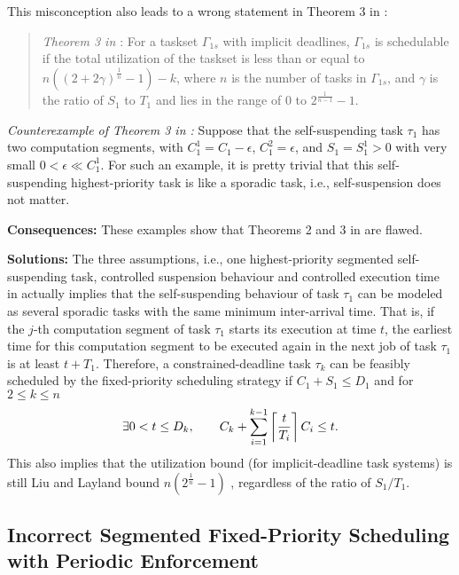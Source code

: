 This misconception also leads to a wrong statement in Theorem 3 in \cite{RTSS-KimANR13}:
\begin{quote}
{\it Theorem 3 in \cite{RTSS-KimANR13}}: For a taskset $\Gamma_{1s}$ with implicit deadlines, $\Gamma_{1s}$ is schedulable if the total utilization of the taskset is less than or equal to $n((2+2\gamma)^{\frac{1}{n}}-1)-k$, where $n$ is the number of tasks in $\Gamma_{1s}$, and $\gamma$ is the ratio of
$S_1$ to $T_1$ and lies in the range of $0$ to $2^{\frac{1}{n-1}}-1$. 
\end{quote}


{\it Counterexample of Theorem 3 in \cite{RTSS-KimANR13}:} Suppose that the self-suspending task $\tau_1$ has two computation segments, with $C_1^1 = C_1-\epsilon$, $C_1^2 = \epsilon$, and $S_1=S_1^1 > 0$ with very small $0 < \epsilon \ll C_1^1$. For such an example, it is pretty trivial that this self-suspending highest-priority task is like a sporadic task, i.e., self-suspension does not matter. 

{\bf Consequences:} These examples show that Theorems 2 and 3 in \cite{RTSS-KimANR13} are flawed.  

{\bf Solutions:} The three assumptions, i.e., one highest-priority segmented self-suspending task, controlled suspension behaviour and controlled execution time  in \cite{RTSS-KimANR13} actually implies that the self-suspending behaviour of task $\tau_1$ can be modeled as several sporadic tasks with the same minimum inter-arrival time. That is, if the $j$-th computation segment of task $\tau_1$ starts its execution at time $t$, the earliest time for this computation segment to be executed again in the next job of task $\tau_1$ is at least $t+T_1$. Therefore, a constrained-deadline task $\tau_k$ can be feasibly scheduled by the fixed-priority scheduling strategy if $C_1+S_1 \leq D_1$ and for $2 \leq k \leq n$
  \begin{equation}
    \label{eq:tda-fixed}
\exists 0 < t \leq D_k, \qquad C_k + \sum_{i=1}^{k-1}\left\lceil{\frac{t}{T_i}}\right\rceil C_i \leq t.    
  \end{equation}
This also implies that the utilization bound (for implicit-deadline task systems) is still Liu and Layland bound $n(2^{\frac{1}{n}}-1)$ \cite{Liu_1973}, regardless of the ratio of $S_1/T_1$. 

\subsection{Incorrect Segmented Fixed-Priority Scheduling with Periodic Enforcement}
\label{sec:wrong-periodic}

